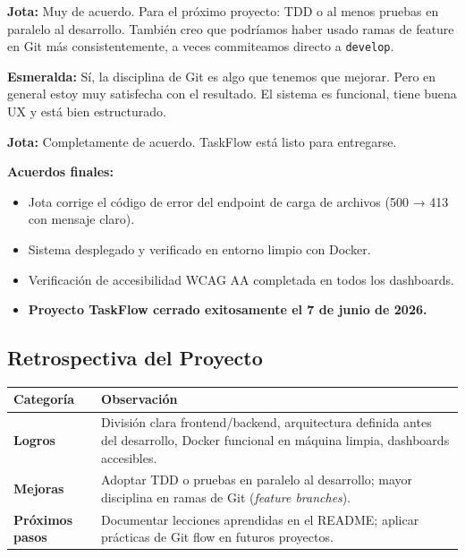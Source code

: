 \documentclass[12pt, a4paper]{article}
\newcommand{\jota}[1]{\noindent\textbf{\color{primary}Jota:} #1\par\smallskip}
\newcommand{\esme}[1]{\noindent\textbf{\color{accentgreen}Esmeralda:} #1\par\smallskip}
\begin{document}
\jota{Muy de acuerdo. Para el próximo proyecto: TDD o al menos pruebas en paralelo al desarrollo. También creo que podríamos haber usado ramas de feature en Git más consistentemente, a veces commiteamos directo a \texttt{develop}.}

\esme{Sí, la disciplina de Git es algo que tenemos que mejorar. Pero en general estoy muy satisfecha con el resultado. El sistema es funcional, tiene buena UX y está bien estructurado.}

\jota{Completamente de acuerdo. TaskFlow está listo para entregarse.}

\begin{acuerdobox}
\textbf{Acuerdos finales:}
\begin{itemize}[leftmargin=1.2em, topsep=2pt]
  \item Jota corrige el código de error del endpoint de carga de archivos (500 → 413 con mensaje claro).
  \item Sistema desplegado y verificado en entorno limpio con Docker.
  \item Verificación de accesibilidad WCAG AA completada en todos los dashboards.
  \item \textbf{Proyecto TaskFlow cerrado exitosamente el 7 de junio de 2026.}
\end{itemize}
\end{acuerdobox}

\vspace{1em}
\begin{mdframed}[
  backgroundcolor=lightblue,
  linecolor=primary,
  linewidth=1.5pt,
  innerleftmargin=14pt, innerrightmargin=14pt,
  innertopmargin=12pt, innerbottommargin=12pt
]
\subsection*{Retrospectiva del Proyecto}
\begin{tabularx}{\linewidth}{@{}lX@{}}
  \toprule
  \textbf{Categoría} & \textbf{Observación} \\
  \midrule
  \textbf{Logros}     & División clara frontend/backend, arquitectura definida antes del desarrollo, Docker funcional en máquina limpia, dashboards accesibles. \\[6pt]
  \textbf{Mejoras}    & Adoptar TDD o pruebas en paralelo al desarrollo; mayor disciplina en ramas de Git (\textit{feature branches}). \\[6pt]
  \textbf{Próximos pasos} & Documentar lecciones aprendidas en el README; aplicar prácticas de Git flow en futuros proyectos. \\
  \bottomrule
\end{tabularx}
\end{mdframed}
\end{document}
